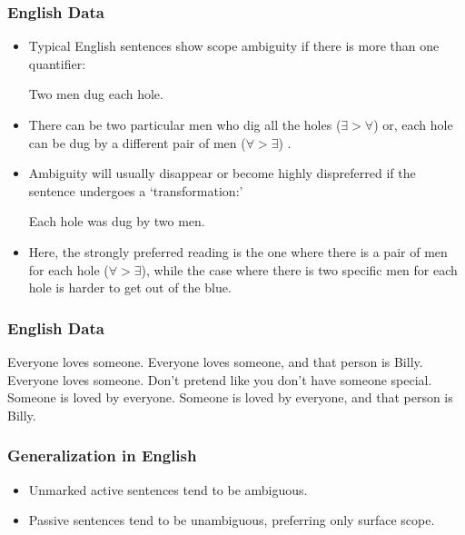 \documentclass{beamer}
\begin{document}
\begin{frame}
\frametitle{English Data}\pause
\begin{itemize}
\item Typical English sentences show scope ambiguity if there is more than one quantifier:\pause
\begin{exe}
\ex Two men dug each hole.
\end{exe}\pause
\item There can be two particular men who dig all the holes ($\exists>\forall$)  or, each hole can be dug by a different pair of men ($\forall>\exists$) .\pause
\item Ambiguity will usually disappear or become highly dispreferred if the sentence undergoes a `transformation:'\pause
\begin{exe}
\ex Each hole was dug by two men.
\end{exe}\pause
\item Here, the strongly preferred reading is the one where there is a pair of men for each hole ($\forall>\exists$), while the case where there is two specific men for each hole is harder to get out of the blue.
\end{itemize}
\end{frame}

\begin{frame}
\frametitle{English Data}\pause
\begin{exe}
\ex Everyone loves someone.\pause
\ex Everyone loves someone, and that person is Billy.\pause
\ex Everyone loves someone. Don't pretend like you don't have someone special.\pause
\ex Someone is loved by everyone.\pause
\ex Someone is loved by everyone, and that person is Billy.\pause
{}
\end{exe}
\end{frame}

\begin{frame}
	\frametitle{Generalization in English}\pause

	\begin{itemize}
		\item Unmarked active sentences tend to be ambiguous.\pause
		\item Passive sentences tend to be unambiguous, preferring only surface scope.
	\end{itemize}

\end{frame}
\end{document}
